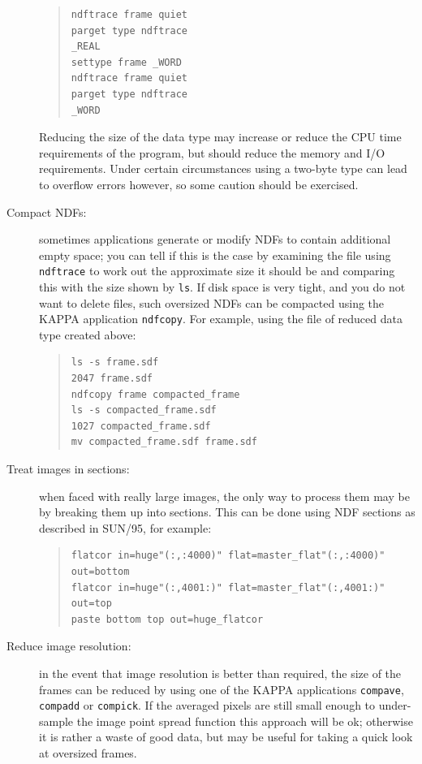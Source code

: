 \documentclass[twoside,11pt]{article}
\newcommand{\xref}[3]{#1}
\begin{document}
\begin{description}
  \begin{quote}
  \begin{verbatim}
ndftrace frame quiet
parget type ndftrace
_REAL
settype frame _WORD
ndftrace frame quiet
parget type ndftrace
_WORD
\end{verbatim}
  \end{quote}

   Reducing the size of the data type may increase or reduce the CPU time
   requirements of the program, but should reduce the memory and I/O
   requirements.
   Under certain circumstances using a two-byte type can lead to
   overflow errors however, so some caution should be exercised.

  \item[Compact NDFs:] sometimes applications generate or modify NDFs to
   contain additional empty space; you can tell if this is the case by
   examining the file using {\tt ndftrace} to work out the approximate size
   it should be and comparing this with the size shown by {\tt ls}.
   If disk space is very tight, and you do not want to delete files, such
   oversized NDFs can be compacted using the KAPPA application {\tt ndfcopy}.
   For example, using the file of reduced data type created above:

  \begin{quote}
  \begin{verbatim}
ls -s frame.sdf
2047 frame.sdf
ndfcopy frame compacted_frame
ls -s compacted_frame.sdf
1027 compacted_frame.sdf
mv compacted_frame.sdf frame.sdf
\end{verbatim}
  \end{quote}

  \item[Treat images in sections:] when faced with really large images, the
   only way to process them may be by breaking them up into sections.
   This can be done using \xref{NDF sections}{sun95}{se_ndfsect}
   as described in \xref{SUN/95}{sun95}{}\/\cite{SUN95}, for example:

  \begin{quote}
  \begin{verbatim}
flatcor in=huge"(:,:4000)" flat=master_flat"(:,:4000)" out=bottom
flatcor in=huge"(:,4001:)" flat=master_flat"(:,4001:)" out=top
paste bottom top out=huge_flatcor
\end{verbatim}
  \end{quote}

  \item[Reduce image resolution:] in the event that image resolution is
   better than required, the size of the frames can be reduced by using one
   of the KAPPA applications 
  \xref{{\tt compave}}{sun95}{COMPAVE},
  \xref{{\tt compadd}}{sun95}{COMPADD} or
  \xref{{\tt compick}}{sun95}{COMPICK}.
   If the averaged pixels are still small enough to under-sample the
   image point spread function this approach will be ok; otherwise it is
   rather a waste of good data, but may be useful for taking a quick look
   at oversized frames.

\end{description}
\end{document}

